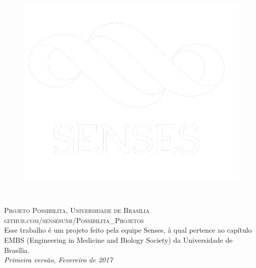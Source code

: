 \documentclass[11pt,fleqn]{book} %
\begin{document}
\begin{figure}[!htb]
	\centering
    \includegraphics[scale = 0.25]{pictures/logo}
\end{figure}

\endgroup


\newpage
~\vfill
\thispagestyle{empty}


\noindent \textsc{Projeto Possibilita, Universidade de Brasília}\\

\noindent \textsc{github.com/sensesunb/Possibilita\_Projetos}\\ %

\noindent Esse trabalho é um projeto feito pela equipe Senses, à qual pertence ao capítulo EMBS (Engineering in Medicine and Biology Society) da Universidade de Brasília. \\ %

\noindent \textit{Primeira versão, Fevereiro de 2017} %

\end{document}
